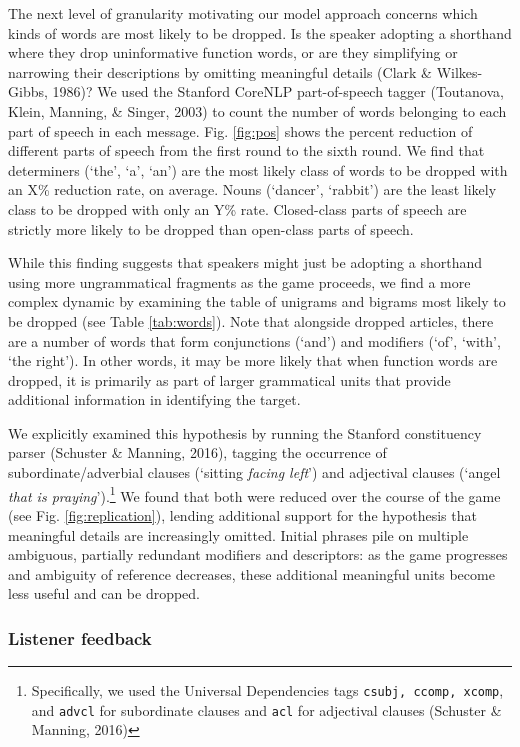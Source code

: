 \documentclass[manuscript]{stjour}
\begin{document}
The next level of granularity motivating our model approach concerns
which kinds of words are most likely to be dropped. Is the speaker
adopting a shorthand where they drop uninformative function words, or
are they simplifying or narrowing their descriptions by omitting
meaningful details (Clark \& Wilkes-Gibbs, 1986)? We used the Stanford
CoreNLP part-of-speech tagger (Toutanova, Klein, Manning, \& Singer,
2003) to count the number of words belonging to each part of speech in
each message. Fig. \ref{fig:pos} shows the percent reduction of
different parts of speech from the first round to the sixth round. We
find that determiners (`the', `a', `an') are the most likely class of
words to be dropped with an X\% reduction rate, on average. Nouns
(`dancer', `rabbit') are the least likely class to be dropped with only
an Y\% rate. Closed-class parts of speech are strictly more likely to be
dropped than open-class parts of speech.

While this finding suggests that speakers might just be adopting a
shorthand using more ungrammatical fragments as the game proceeds, we
find a more complex dynamic by examining the table of unigrams and
bigrams most likely to be dropped (see Table \ref{tab:words}). Note that
alongside dropped articles, there are a number of words that form
conjunctions (`and') and modifiers (`of', `with', `the right'). In other
words, it may be more likely that when function words are dropped, it is
primarily as part of larger grammatical units that provide additional
information in identifying the target.

We explicitly examined this hypothesis by running the Stanford
constituency parser (Schuster \& Manning, 2016), tagging the occurrence
of subordinate/adverbial clauses (`sitting \emph{facing left}') and
adjectival clauses (`angel \emph{that is praying}').\footnote{Specifically,
  we used the Universal Dependencies tags \texttt{csubj, ccomp, xcomp},
  and \texttt{advcl} for subordinate clauses and \texttt{acl} for
  adjectival clauses (Schuster \& Manning, 2016)} We found that both
were reduced over the course of the game (see Fig.
\ref{fig:replication}), lending additional support for the hypothesis
that meaningful details are increasingly omitted. Initial phrases pile
on multiple ambiguous, partially redundant modifiers and descriptors: as
the game progresses and ambiguity of reference decreases, these
additional meaningful units become less useful and can be dropped.

\subsubsection{Listener feedback}\label{listener-feedback}
\end{document}
